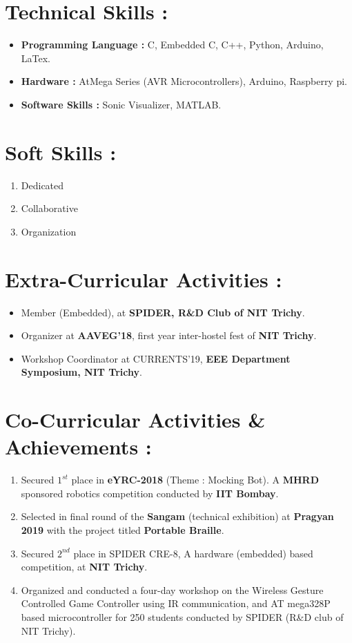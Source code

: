 \documentclass[a4paper, 12 pt]{article}
\begin{document}
\section*{Technical Skills :}
\begin{itemize}
\item {\large {\bf Programming Language :}} C, Embedded C, C++, Python, Arduino, LaTex.
\item {\large {\bf Hardware :}} AtMega Series (AVR Microcontrollers), Arduino, Raspberry pi.
\item {\large {\bf Software Skills :}} Sonic Visualizer, MATLAB.
\end{itemize}
\section*{Soft Skills :}
\begin{enumerate}
\item Dedicated
\item Collaborative
\item Organization
\end{enumerate}
\section*{Extra-Curricular Activities :}
\begin{itemize}
\item Member (Embedded), at {\bf SPIDER, R\&D Club of NIT Trichy}.
\item Organizer at {\bf AAVEG’18}, first year inter-hostel fest of {\bf NIT Trichy}.
\item Workshop Coordinator at CURRENTS’19, {\bf EEE Department Symposium, NIT Trichy}.
\end{itemize}
\section*{Co-Curricular Activities \& Achievements :}
\begin{enumerate}
\item Secured $1^{st}$ place in {\bf  eYRC-2018} (Theme : Mocking Bot). A {\bf MHRD} sponsored robotics competition conducted by {\bf IIT Bombay}.
\item Selected in final round of the {\bf Sangam} (technical exhibition) at {\bf Pragyan 2019} with the project titled {\bf Portable Braille}.
\item Secured $2^{nd}$ place in SPIDER CRE-8, A hardware (embedded) based competition, at {\bf NIT Trichy}.
\item Organized and conducted a four-day workshop on the Wireless Gesture Controlled Game Controller using IR communication, and AT mega328P based microcontroller for 250 students conducted by SPIDER (R\&D club of NIT Trichy).
\end{enumerate}
\end{document}
